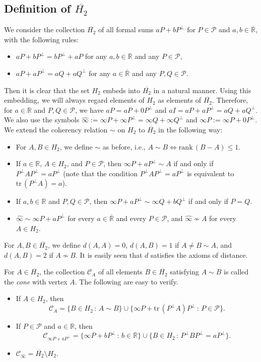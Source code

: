 \documentclass[10pt]{amsart}
\theoremstyle{definition}
\theoremstyle{remark}
\numberwithin{subsection}{section}
\numberwithin{equation}{section}
\newcommand\cC{{\mathcal{C}}}
\newcommand\cP{{\mathcal{P}}}
\newcommand\bR{{\mathbb{R}}}
\newcommand\oH{{\overline{H_2}}}
\newcommand\oi{{\widehat{\infty}}}
\newcommand\oR{{\overline{\mathbb{R}}}}
\begin{document}
\subsection{Definition of $\oH$}
We consider the collection $\oH$ \index{$H$@$\oH$} of all formal sums $aP+bP^{\perp}$ for $P\in \cP$ and $a, b\in \oR$, with the following rules:
\begin{itemize}
\item  $aP+bP^\perp=bP^\perp+aP$ for any $a, b\in {\oR}$ and any $P\in \cP$,  
\item $a P+a P^{\perp}=a Q+a Q^{\perp}$ for any $a\in {\oR}$ and any $P, Q\in \cP$. 
\end{itemize}
Then it is clear that the set $H_2$ embeds into $\oH$ in a natural manner.
Using this embedding, we will always regard elements of $H_2$ as elements of $\oH$.
Therefore, for $a\in \mathbb{R}$ and $P, Q\in \cP$, we have $a P = a P +0P^\perp$ and $aI =aP+aP^\perp =aQ+aQ^\perp$.
We also use the symbols ${\oi}:=\infty P+\infty P^{\perp}=\infty Q+\infty Q^{\perp}$\index{$\infty$2@$\oi$} and $\infty P := \infty P +0P^\perp$.
We extend the coherency relation $\sim$ on $H_2$ to $\oH$ in the following way\index{$\sim$2@$\sim$ (on $\oH$)}: 
\begin{itemize}
\item For $A, B\in H_2$, we define $\sim$ as before, i.e., $A\sim B \iff \mathrm{rank}\, (B - A ) \le 1$. 
\item If $a\in \bR$, $A\in H_2$, and $P\in\cP$, then $\infty P+a P^{\perp}\sim A$ if and only if $P^{\perp} AP^{\perp}=aP^{\perp}$ (note that the condition $P^{\perp} AP^{\perp}=aP^{\perp}$ is equivalent to $\mathrm{tr}\, (P^\perp A) = a$).
\item If $a, b\in \bR$ and $P, Q\in \cP$, then $\infty P+a P^{\perp}\sim \infty Q + bQ^{\perp}$ if and only if $P=Q$. 
\item ${\oi} \sim \infty P+aP^{\perp}$ for every $a\in {\oR}$ and every $P\in \cP$, and ${\oi} \not\sim A$ for every $A\in H_2$.
\end{itemize}
For $A, B\in \oH$, we define $d(A, A)=0$, $d(A, B)=1$ if $A\neq B\sim A$, and $d(A, B)=2$ if $A\not\sim B$. It is easily seen that $d$ satisfies the axioms of distance. 

For $A\in \oH$, the collection $\cC_A$ \index{$C(A)$@$\cC_A$} of all elements $B\in \oH$ satisfying $A\sim B$ is called the \emph{cone}  with vertex $A$. The following are easy to verify.
\begin{itemize}
\item If $A\in H_2$, then 
\[
\cC_A=\{B\in H_2\,:\, A\sim B\} \cup \{\infty P+\mathrm{tr}\, (P^\perp A) P^\perp\,:\, P\in \cP\}.
\]
\item If $P\in \cP$ and $a\in \bR$, then 
\[
\cC_{\infty P+ aP^{\perp}}=\{\infty P+ bP^{\perp}\,:\, b\in {\oR}\} \cup \{B\in H_2\,:\, P^{\perp}BP^{\perp}=aP^\perp\}.
\] 
\item $\cC_{\oi} =\oH\setminus H_2$.
\end{itemize}
\end{document}
